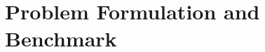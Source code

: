 \documentclass[letterpaper]{article} %
\begin{document}
\section{Problem Formulation and Benchmark}


\end{document}

